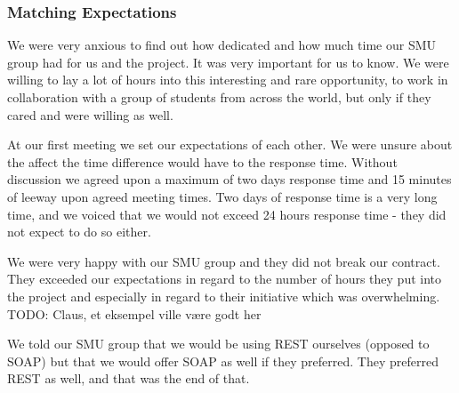 \subsubsection{Matching Expectations}
We were very anxious to find out how dedicated and how much time our SMU group had for us and the project. It was very important for us to know. We were willing to lay a lot of hours into this interesting and rare opportunity, to work in collaboration with a group of students from across the world, but only if they cared and were willing as well.

At our first meeting we set our expectations of each other. We were unsure about the affect the time difference would have to the response time. Without discussion we agreed upon a maximum of two days response time and 15 minutes of leeway upon agreed meeting times. Two days of response time is a very long time, and we voiced that we would not exceed 24 hours response time - they did not expect to do so either.

We were very happy with our SMU group and they did not break our contract. They exceeded our expectations in regard to the number of hours they put into the project and especially in regard to their initiative which was overwhelming. {TODO: Claus, et eksempel ville være godt her}

We told our SMU group that we would be using REST ourselves (opposed to SOAP) but that we would offer SOAP as well if they preferred. They preferred REST as well, and that was the end of that.
